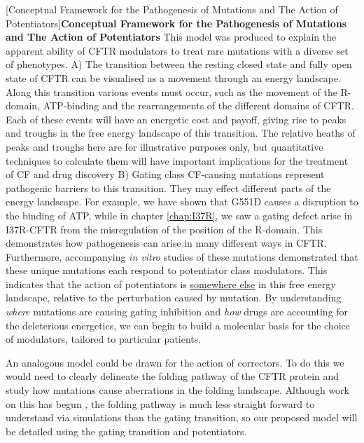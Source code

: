 	[Conceptual Framework for the Pathogenesis of Mutations and The Action of Potentiators]{\textbf{Conceptual Framework for the Pathogenesis of Mutations and The Action of Potentiators}{ This model was produced to explain the apparent ability of CFTR modulators to treat rare mutations with a diverse set of phenotypes. A) The transition between the resting closed state and fully open state of CFTR can be visualised as a movement through an energy landscape. Along this transition various events must occur, such as the movement of the R-domain, ATP-binding and the rearrangements of the different domains of CFTR. Each of these events will have an energetic cost and payoff, giving rise to peaks and troughs in the free energy landscape of this transition. The relative heaths of peaks and troughs here are for illustrative purposes only, but quantitative techniques to calculate them will have important implications for the treatment of CF and drug discovery B) Gating class CF-causing mutations represent pathogenic barriers to this transition. They may effect different parts of the energy landscape. For example, we have shown that G551D causes a disruption to the binding of ATP, while in chapter \ref{chap:I37R}, we saw a gating defect arise in I37R-CFTR from the misregulation of the position of the R-domain. This demonstrates how pathogenesis can arise in many different ways in CFTR. Furthermore, accompanying \textit{in vitro} studies of these mutations demonstrated that these unique mutations each respond to potentiator class modulators. This indicates that the action of potentiators is \underline{somewhere else} in this free energy landscape, relative to the perturbation caused by mutation. By understanding \textit{where} mutations are causing gating inhibition and \textit{how} drugs are accounting for the deleterious energetics, we can begin to build a molecular basis for the choice of modulators, tailored to particular patients.}}
	\label{drug_action_model}

	\endgroup


An analogous model could be drawn for the action of correctors. To do this we would need to clearly delineate the folding pathway of the CFTR protein and study how mutations cause aberrations in the folding landscape. Although work on this has begun \cite{krainer2018, kleizen2021, kleizen2020, fiedorczuk2022}, the folding pathway is much less straight forward to understand via simulations than the gating transition, so our proposed model will be detailed using the gating transition and potentiators.

